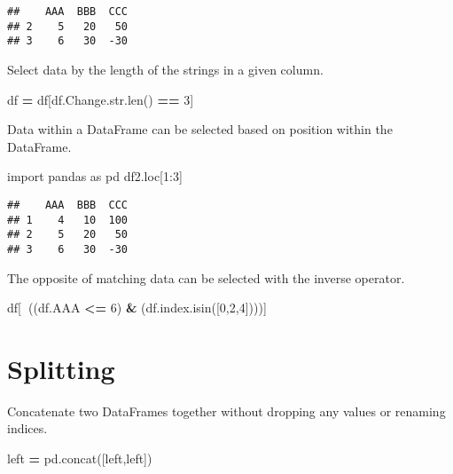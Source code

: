 \documentclass[]{book}
\newenvironment{Shaded}{\begin{snugshade}}{\end{snugshade}}
\newcommand{\BuiltInTok}[1]{#1}
\newcommand{\DecValTok}[1]{\textcolor[rgb]{0.00,0.00,0.81}{#1}}
\newcommand{\ImportTok}[1]{#1}
\newcommand{\NormalTok}[1]{#1}
\newcommand{\OperatorTok}[1]{\textcolor[rgb]{0.81,0.36,0.00}{\textbf{#1}}}
\begin{document}
\begin{verbatim}
##    AAA  BBB  CCC
## 2    5   20   50
## 3    6   30  -30
\end{verbatim}

Select data by the length of the strings in a given column.

\begin{Shaded}
\begin{Highlighting}[]
\NormalTok{df }\OperatorTok{=}\NormalTok{ df[df.Change.}\BuiltInTok{str}\NormalTok{.}\BuiltInTok{len}\NormalTok{() }\OperatorTok{==} \DecValTok{3}\NormalTok{]}
\end{Highlighting}
\end{Shaded}

Data within a DataFrame can be selected based on position within the DataFrame.

\begin{Shaded}
\begin{Highlighting}[]
\ImportTok{import}\NormalTok{ pandas }\ImportTok{as}\NormalTok{ pd}
\NormalTok{df2.loc[}\DecValTok{1}\NormalTok{:}\DecValTok{3}\NormalTok{]}
\end{Highlighting}
\end{Shaded}

\begin{verbatim}
##    AAA  BBB  CCC
## 1    4   10  100
## 2    5   20   50
## 3    6   30  -30
\end{verbatim}

The opposite of matching data can be selected with the inverse operator.

\begin{Shaded}
\begin{Highlighting}[]
\NormalTok{df[}\OperatorTok{~}\NormalTok{((df.AAA }\OperatorTok{<=} \DecValTok{6}\NormalTok{) }\OperatorTok{&}\NormalTok{ (df.index.isin([}\DecValTok{0}\NormalTok{,}\DecValTok{2}\NormalTok{,}\DecValTok{4}\NormalTok{])))]}
\end{Highlighting}
\end{Shaded}

\hypertarget{splitting}{%
\section{Splitting}\label{splitting}}

Concatenate two DataFrames together without dropping any values or renaming indices.

\begin{Shaded}
\begin{Highlighting}[]
\NormalTok{left }\OperatorTok{=}\NormalTok{ pd.concat([left,left])}
\end{Highlighting}
\end{Shaded}
\end{document}
